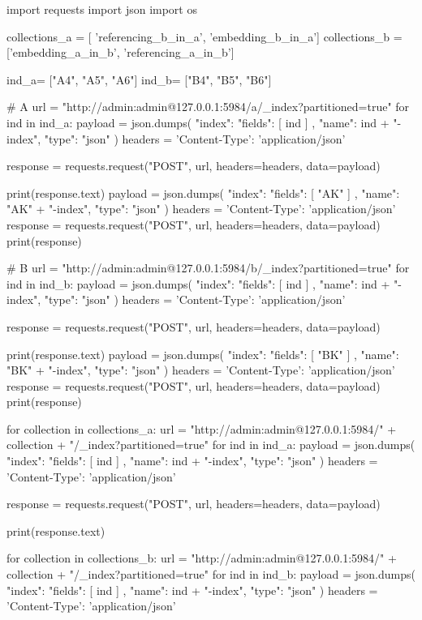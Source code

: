 \begin{Verbatim*}
import requests
import json
import os 

collections_a = [ 'referencing_b_in_a', 'embedding_b_in_a']
collections_b = ['embedding_a_in_b',  'referencing_a_in_b']

ind_a= ["A4",  "A5", "A6"]
ind_b= ["B4",  "B5", "B6"]

# A 
url = "http://admin:admin@127.0.0.1:5984/a/_index?partitioned=true"
for ind  in ind_a:
  payload = json.dumps({
    "index": {
      "fields": [
        ind
      ]
    },
    "name": ind + "-index",
    "type": "json"
  })
  headers = {
    'Content-Type': 'application/json'
  }

  response = requests.request("POST", url, headers=headers, data=payload)

  print(response.text)
payload = json.dumps({
  "index": {
    "fields": [
      "AK"
    ]
  },
  "name": "AK" + "-index",
  "type": "json"
})
headers = {
  'Content-Type': 'application/json'
}
response = requests.request("POST", url, headers=headers, data=payload)
print(response)

# B 
url = "http://admin:admin@127.0.0.1:5984/b/_index?partitioned=true"
for ind  in ind_b:
  payload = json.dumps({
    "index": {
      "fields": [
        ind
      ]
    },
    "name": ind + "-index",
    "type": "json"
  })
  headers = {
    'Content-Type': 'application/json'
  }

  response = requests.request("POST", url, headers=headers, data=payload)

  print(response.text)
payload = json.dumps({
  "index": {
    "fields": [
      "BK"
    ]
  },
  "name": "BK" + "-index",
  "type": "json"
})
headers = {
  'Content-Type': 'application/json'
}
response = requests.request("POST", url, headers=headers, data=payload)
print(response)

for collection in collections_a:
    url = "http://admin:admin@127.0.0.1:5984/" + collection + "/_index?partitioned=true"
    for ind  in ind_a:
        payload = json.dumps({
          "index": {
            "fields": [
              ind
            ]
          },
          "name": ind + "-index",
          "type": "json"
        })
        headers = {
          'Content-Type': 'application/json'
        }

        response = requests.request("POST", url, headers=headers, data=payload)

        print(response.text)

for collection in collections_b:
    url = "http://admin:admin@127.0.0.1:5984/" + collection + "/_index?partitioned=true"
    for ind  in ind_b:
        payload = json.dumps({
          "index": {
            "fields": [
              ind
            ]
          },
          "name": ind + "-index",
          "type": "json"
        })
        headers = {
          'Content-Type': 'application/json'
        }


\end{Verbatim*}
